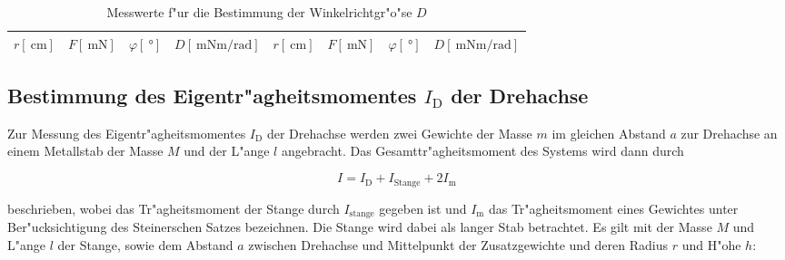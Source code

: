 
		\begin{table}[h!]
			\begin{center}
				\caption{Messwerte f"ur die Bestimmung der Winkelrichtgr"o"se $D$ \label{tabelle:winkelrichtgroesse}}
				\begin{tabular}{|c|c|c|c||c|c|c|c|}
					\hline
						$r [\SI{}{\centi \meter}]$ & 
						$F [\SI{}{\milli \newton}]$ & 
						$\varphi [\SI{}{\degree}]$ & 
						$D \left[\SI{}{\milli \newton \meter \per \radian}\right]$ & 
						$r [\SI{}{\centi \meter}]$ & 
						$F [\SI{}{\milli \newton}]$ & 
						$\varphi [\SI{}{\degree}]$ & 
						$D \left[\SI{}{\milli \newton \meter \per \radian}\right]$\\
					\hline 
					\hline
					
					\hline 
				\end{tabular}
			\end{center}
		\end{table}

	\subsection{Bestimmung des Eigentr"agheitsmomentes $I_\mathrm{D}$ der Drehachse}
	\label{subsec:eigentraegheitsmoment}
		Zur Messung des Eigentr"agheitsmomentes $I_\mathrm{D}$ der Drehachse werden zwei Gewichte der Masse $m$ im gleichen Abstand $a$ zur Drehachse an einem Metallstab der Masse $M$ und der L"ange $l$ angebracht.
		Das Gesamttr"agheitsmoment des Systems wird dann durch

		\begin{equation}
			I = I_\mathrm{D} + I_\mathrm{Stange} + 2 I_\mathrm{m} \, \label{eqn:gesamtmoment}
		\end{equation}

		beschrieben, wobei das Tr"agheitsmoment der Stange durch $I_\mathrm{stange}$ gegeben ist und $I_\mathrm{m}$ das Tr"agheitsmoment eines Gewichtes unter Ber"ucksichtigung des Steinerschen Satzes bezeichnen. 
		Die Stange wird dabei als langer Stab betrachtet.
		Es gilt mit der Masse $M$ und L"ange $l$ der Stange, sowie dem Abstand $a$ zwischen Drehachse und Mittelpunkt der Zusatzgewichte und deren Radius $r$ und H"ohe $h$:

